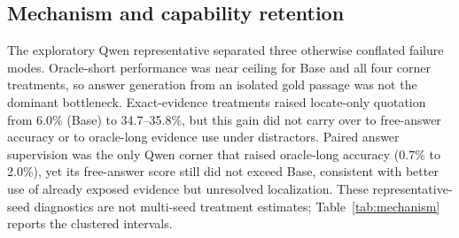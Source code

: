 \documentclass[11pt]{article}
\begin{document}
\begin{table}[t]
\centering
\scriptsize
\setlength{\tabcolsep}{3pt}
\caption{Key strict block-complete factorial contrasts in percentage points, shown as seed-level mean [95\% Student-$t$ interval]. Positive $\Delta$Worst is better, whereas positive $\Delta$Gap is worse; positive LongBench $\Delta$F1 is better. These contrasts predate the realized-subset correction; complete per-seed contrasts, within-seed paired bootstrap intervals, and Holm-adjusted tests are included in the released analysis files.}
\label{tab:factorial-contrasts}
\end{table}

\subsection{Mechanism and capability retention}

The exploratory Qwen representative separated three otherwise conflated failure modes. Oracle-short performance was near ceiling for Base and all four corner treatments, so answer generation from an isolated gold passage was not the dominant bottleneck. Exact-evidence treatments raised locate-only quotation from 6.0\% (Base) to 34.7--35.8\%, but this gain did not carry over to free-answer accuracy or to oracle-long evidence use under distractors. Paired answer supervision was the only Qwen corner that raised oracle-long accuracy (0.7\% to 2.0\%), yet its free-answer score still did not exceed Base, consistent with better use of already exposed evidence but unresolved localization. These representative-seed diagnostics are not multi-seed treatment estimates; Table~\ref{tab:mechanism} reports the clustered intervals.
\end{document}
